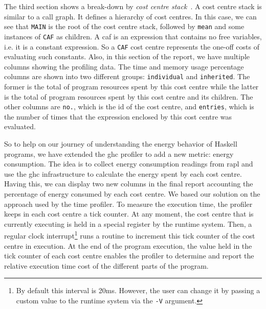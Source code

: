 The third section shows a break-down by \emph{cost centre stack}~\cite{morgan:1998}. A cost centre stack is similar to a call graph. It defines a hierarchy of cost centres. In this case, we can see that \texttt{MAIN} is the root of the cost centre stack, followed by \texttt{mean} and some instances of \texttt{CAF} as children. A \ac{caf} is an expression that contains no free variables, i.e. it is a constant expression. So a \texttt{CAF} cost centre represents the one-off costs of evaluating such constants. Also, in this section of the report, we have multiple columns showing the profiling data. The time and memory usage percentage columns are shown into two different groups: \texttt{individual} and \texttt{inherited}. The former is the total of program resources spent by this cost centre while the latter is the total of program resources spent by this cost centre and its children. The other columns are \texttt{no.}, which is the id of the cost centre, and \texttt{entries}, which is the number of times that the expression enclosed by this cost centre was evaluated.

So to help on our journey of understanding the energy behavior of Haskell programs, we have extended the \ac{ghc} profiler to add a new metric: energy consumption. The idea is to collect energy consumption readings from \ac{rapl} and use the \ac{ghc} infrastructure to calculate the energy spent by each cost centre. Having this, we can display two new columns in the final report accounting the percentage of energy consumed by each cost centre. We based our solution on the approach used by the time profiler. To measure the execution time, the profiler keeps in each cost centre a tick counter. At any moment, the cost centre that is currently executing is held in a special register by the runtime system. Then, a regular clock interrupt\footnote{By default this interval is 20ms. However, the user can change it by passing a custom value to the runtime system via the \texttt{-V} argument.} runs a routine to increment this tick counter of the cost centre in execution. At the end of the program execution, the value held in the tick counter of each cost centre enables the profiler to determine and report the relative execution time cost of the different parts of the program.

